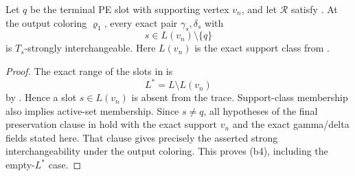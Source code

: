 \begin{lemma}
Let \(q\) be the terminal PE slot with supporting vertex \(v_n\), and
let \(\mathcal R\) satisfy
.  At the output coloring
\(\varrho_1\), every exact pair \(\gamma_s,\delta_s\) with
\[
             s\in L(v_n)\setminus\{q\}
\]
is \(T_s\)-strongly interchangeable.  Here \(L(v_n)\) is the exact
support class from .
\end{lemma}
\begin{proof}
The exact range of the slots in
 is
\[
 L^*=L\setminus L(v_n)
\]
by .  Hence a slot
\(s\in L(v_n)\) is absent from the trace.  Support-class membership also
implies active-set membership.  Since \(s\ne q\), all hypotheses of the
final preservation clause in
 hold with the exact
support \(v_n\) and the exact gamma/delta fields stated here.  That
clause gives precisely the asserted strong interchangeability under the
output coloring.  This proves (b4), including the empty-\(L^*\) case.
\end{proof}
